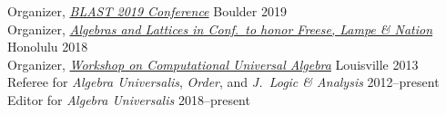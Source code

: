 
    \newcommand{\mytab}{\phantom{\textsl{Activities: }}}
    \renewcommand{\mytab}{\phantom{XX}}
    Organizer, \href{https://math.colorado.edu/blast/2019/index.html}{\emph{BLAST 2019 Conference}} \hfill  Boulder 2019
    \\
    Organizer, \href{https://universalalgebra.github.io/ALH-2018/}
    {\emph{Algebras and Lattices in \Hawaii Conf.~{\small to honor Freese, Lampe \& Nation}}} \hfill  Honolulu 2018
    \\
    Organizer, \href{http://universalalgebra.wordpress.com/meetings/2013-workshop-on-computational-universal-algebra/}
    {\emph{Workshop on Computational Universal Algebra}} \hfill  Louisville 2013
    \\
    Referee for {\it Algebra Universalis}, {\it Order}, and {\it J.~Logic \& Analysis} \hfill 2012--present
    \\
    Editor for {\it Algebra Universalis} \hfill 2018--present

